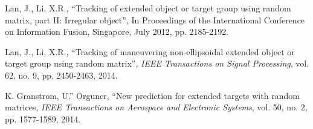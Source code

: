 \documentclass[12pt,draftcls,onecolumn]{IEEEtran}
\begin{document}
\begin{thebibliography}{99}
Lan, J., Li, X.R., ``Tracking of extended object or target group
using random matrix, part II: Irregular object'', In Proceedings of
the International Conference on Information Fusion, Singapore, July
2012, pp. 2185-2192.

Lan, J., Li, X.R., ``Tracking of maneuvering non-ellipsoidal
extended object or target group using random matrix'', \emph{IEEE
Transactions on Signal Processing}, vol. 62, no. 9, pp. 2450-2463,
2014.


K. Granstrom, U.'' Orguner, ``New prediction for extended targets
with random matrices, \emph{IEEE Transactions on Aerospace and
Electronic Systems}, vol. 50, no. 2, pp. 1577-1589, 2014.
\end{thebibliography}
\end{document}

